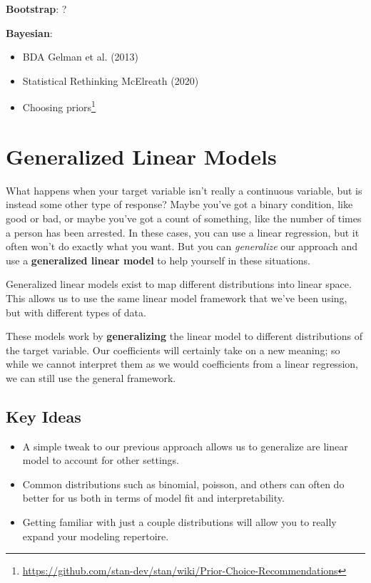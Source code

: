 \documentclass[
  letterpaper,
]{krantz}
\providecommand{\tightlist}{%
  \setlength{\itemsep}{0pt}\setlength{\parskip}{0pt}}\usepackage{longtable,booktabs,array}
\DeclareRobustCommand{\href}[2]{#2\footnote{\url{#1}}}
\begin{document}
\textbf{Bootstrap}: ?

\textbf{Bayesian}:

\begin{itemize}
\tightlist
\item
  BDA Gelman et al. (2013)
\item
  Statistical Rethinking McElreath (2020)
\item
  \href{https://github.com/stan-dev/stan/wiki/Prior-Choice-Recommendations}{Choosing
  priors}
\end{itemize}

\chapter{Generalized Linear Models}\label{sec-glm}

What happens when your target variable isn't really a continuous
variable, but is instead some other type of response? Maybe you've got a
binary condition, like good or bad, or maybe you've got a count of
something, like the number of times a person has been arrested. In these
cases, you can use a linear regression, but it often won't do exactly
what you want. But you can \emph{generalize} our approach and use a
\textbf{generalized linear model} to help yourself in these situations.

Generalized linear models exist to map different distributions into
linear space. This allows us to use the same linear model framework that
we've been using, but with different types of data.

These models work by \textbf{generalizing} the linear model to different
distributions of the target variable. Our coefficients will certainly
take on a new meaning; so while we cannot interpret them as we would
coefficients from a linear regression, we can still use the general
framework.

\section{Key Ideas}\label{sec-glm-key}

\begin{itemize}
\tightlist
\item
  A simple tweak to our previous approach allows us to generalize are
  linear model to account for other settings.
\item
  Common distributions such as binomial, poisson, and others can often
  do better for us both in terms of model fit and interpretability.
\item
  Getting familiar with just a couple distributions will allow you to
  really expand your modeling repertoire.
\end{itemize}
\end{document}
